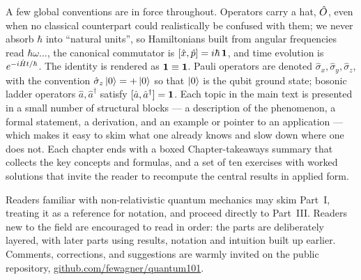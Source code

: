 A few global conventions are in force throughout. Operators carry
a hat, $\hat{O}$, even when no classical counterpart could
realistically be confused with them; we never absorb $\hbar$ into
``natural units'', so Hamiltonians built from angular frequencies
read $\hbar\omega\dots$, the canonical commutator is
$[\hat{x},\hat{p}]=i\hbar\,\mathbf{1}$, and time evolution is
$e^{-i\hat{H}t/\hbar}$. The identity is rendered as
$\mathbf{1}\equiv\mathbf{1}$. Pauli operators are denoted
$\hat\sigma_x,\hat\sigma_y,\hat\sigma_z$, with the convention
$\hat\sigma_z\ket{0}=+\ket{0}$ so that $\ket{0}$ is the qubit
ground state; bosonic ladder operators
$\hat a,\hat a^\dagger$ satisfy
$[\hat a,\hat a^\dagger]=\mathbf{1}$. Each topic in the main text is
presented in a small number of structural blocks --- a
description of the phenomenon, a formal statement, a derivation,
and an example or pointer to an application --- which makes it
easy to skim what one already knows and slow down where one does
not. Each chapter ends with a boxed Chapter-takeaways summary that
collects the key concepts and formulas, and a set of ten
exercises with worked solutions that invite the reader to
recompute the central results in applied form.

Readers familiar with non-relativistic quantum mechanics may skim
Part~I, treating it as a reference for notation, and proceed
directly to Part~III. Readers new to the field are encouraged to
read in order: the parts are deliberately layered, with later
parts using results, notation and intuition built up
earlier. Comments, corrections, and suggestions are warmly invited
on the public repository,
\href{https://github.com/fewagner/quantum101}{github.com/fewagner/quantum101}.
